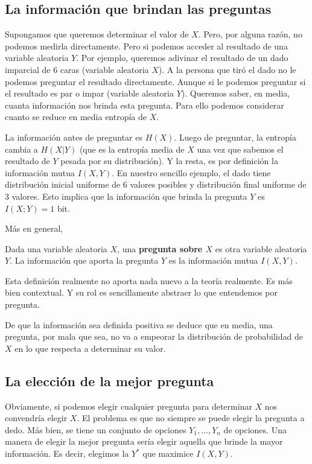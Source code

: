 \subsection{La informaci\'on que brindan las preguntas}
Supongamos que queremos determinar el valor de $X$. Pero, por alguna raz\'on, no podemos medirla directamente. Pero si podemos acceder al resultado de una variable aleatoria $Y$.
Por ejemplo, queremos adivinar el resultado de un dado imparcial de 6 caras (variable aleatoria $X$). A la persona que tir\'o el dado no le podemos preguntar el resultado directamente. Aunque si le podemos preguntar si el resultado es par o impar (variable aleatoria $Y$). Queremos saber, en media, cuanta informaci\'on nos brinda esta pregunta. Para ello podemos considerar cuanto se reduce en media entrop\'ia de $X$.

La informaci\'on antes de preguntar es $H(X)$. Luego de preguntar, la entrop\'ia cambia a $H(X|Y)$ (que es la entrop\'ia media de $X$ una vez que sabemos el resultado de $Y$ pesada por su distribuci\'on). Y la resta, es por definici\'on la informaci\'on mutua $I(X,Y)$. En nuestro sencillo ejemplo, el dado tiene distribuci\'on inicial uniforme de 6 valores posibles y distribuci\'on final uniforme de 3 valores. Esto implica que la informaci\'on que brinda la pregunta $Y$ es $I(X;Y)=1$ bit.

M\'as en general,
\begin{definition}
    Dada una variable aleatoria $X$, una {\bf pregunta sobre $X$} es otra variable aleatoria $Y$. La informaci\'on que aporta la pregunta $Y$ es la informaci\'on mutua $I(X,Y)$.
\end{definition}
Esta definici\'on realmente no aporta nada nuevo a la teor\'ia realmente. Es m\'as bien contextual. Y su rol es sencillamente abstraer lo que entendemos por pregunta.

De que la informaci\'on sea definida positiva se deduce que en media, una pregunta, por mala que sea, no va a empeorar la distribuci\'on de probabilidad de $X$ en lo que respecta a determinar su valor.

\subsection{La elecci\'on de la mejor pregunta}
Obviamente, si podemos elegir cualquier pregunta para determinar $X$ nos convendr\'ia elegir $X$. El problema es que no siempre se puede elegir la pregunta a dedo. M\'as bien, se tiene un conjunto de opciones $Y_1,...,Y_n$ de opciones. Una manera de elegir la mejor pregunta ser\'ia elegir aquella que brinde la mayor informaci\'on. Es decir, elegimos la $Y^*$ que maximice $I(X,Y)$.

